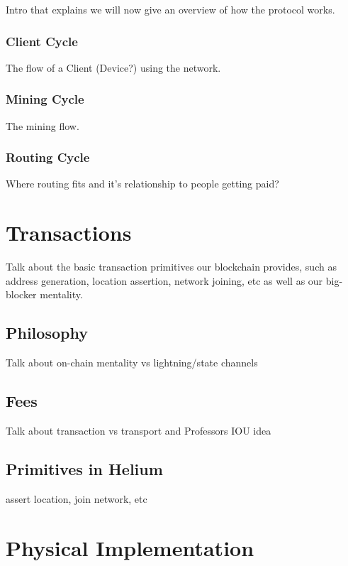 \documentclass[letterpaper,11pt]{article}
\begin{document}
Intro that explains we will now give an overview of how the protocol works.

\subsubsection{Client Cycle}

The flow of a Client (Device?) using the network.

\subsubsection{Mining Cycle}

The mining flow.

\subsubsection{Routing Cycle}

Where routing fits and it's relationship to people getting paid?

\section{Transactions} \label{transactions}

Talk about the basic transaction primitives our blockchain provides, such as address generation, location assertion, network joining, etc as well as our big-blocker mentality.

\subsection{Philosophy}

Talk about on-chain mentality vs lightning/state channels

\subsection{Fees}

Talk about transaction vs transport and Professors IOU idea

\subsection{Primitives in Helium}

assert location, join network, etc

\section{Physical Implementation}
\end{document}
